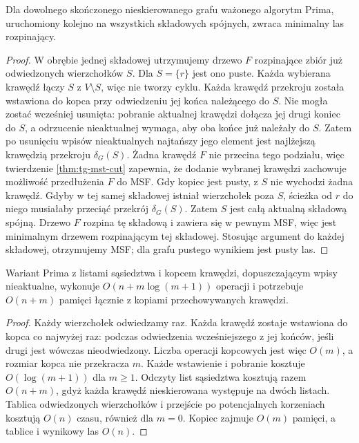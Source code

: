 \begin{twierdzenie}
\label{thm:tg-mst-prim}
Dla dowolnego skończonego
nieskierowanego grafu ważonego
algorytm Prima, uruchomiony
kolejno na wszystkich
składowych spójnych,
zwraca minimalny las
rozpinający.
\end{twierdzenie}
\begin{proof}
W obrębie jednej składowej
utrzymujemy drzewo $F$
rozpinające zbiór
już odwiedzonych wierzchołków
$S$. Dla $S=\{r\}$ jest ono
puste. Każda wybierana
krawędź łączy $S$ z
$V\setminus S$, więc
nie tworzy cyklu.
Każda krawędź przekroju została wstawiona do kopca
przy odwiedzeniu jej końca należącego do $S$.
Nie mogła zostać wcześniej usunięta: pobranie aktualnej
krawędzi dołącza jej drugi koniec do $S$, a odrzucenie
nieaktualnej wymaga, aby oba końce już należały do $S$.
Zatem po usunięciu wpisów nieaktualnych
najtańszy jego element
jest najlżejszą krawędzią
przekroju $\delta_G(S)$.
Żadna krawędź $F$
nie przecina tego podziału,
więc twierdzenie
\ref{thm:tg-mst-cut} zapewnia,
że dodanie wybranej
krawędzi zachowuje
możliwość przedłużenia
$F$ do MSF.
Gdy kopiec jest pusty, z $S$ nie wychodzi żadna
krawędź. Gdyby w tej samej składowej istniał
wierzchołek poza $S$, ścieżka od $r$ do niego
musiałaby przeciąć przekrój $\delta_G(S)$.
Zatem $S$ jest całą aktualną składową spójną.
Drzewo $F$ rozpina tę składową i zawiera się
w pewnym MSF, więc jest minimalnym drzewem
rozpinającym tej składowej. Stosując argument
do każdej składowej, otrzymujemy MSF; dla grafu
pustego wynikiem jest pusty las.
\end{proof}

\begin{stwierdzenie}
\label{prop:tg-mst-prim-cost}
Wariant Prima z listami
sąsiedztwa i kopcem
krawędzi, dopuszczającym
wpisy nieaktualne,
wykonuje $O(n+m\log(m+1))$
operacji i potrzebuje
$O(n+m)$ pamięci
łącznie z kopiami
przechowywanych krawędzi.
\end{stwierdzenie}
\begin{proof}
Każdy wierzchołek
odwiedzamy raz.
Każda krawędź zostaje
wstawiona do kopca
co najwyżej raz:
podczas odwiedzenia
wcześniejszego z jej
końców, jeśli drugi
jest wówczas nieodwiedzony.
Liczba operacji kopcowych
jest więc $O(m)$,
a rozmiar kopca nie
przekracza $m$.
Każde wstawienie i pobranie kosztuje
$O(\log(m+1))$ dla $m\geq1$. Odczyty list
sąsiedztwa kosztują razem $O(n+m)$, gdyż
każda krawędź nieskierowana występuje na dwóch listach.
Tablica odwiedzonych wierzchołków i przejście po
potencjalnych korzeniach kosztują $O(n)$ czasu,
również dla $m=0$. Kopiec zajmuje $O(m)$ pamięci,
a tablice i wynikowy las $O(n)$.
\end{proof}

